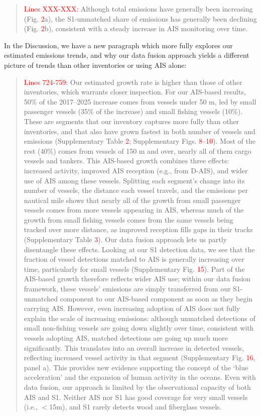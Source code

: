 \documentclass[11pt]{article}
\begin{document}
\begin{quote}
\textcolor{red}{Lines XXX-XXX:}
Although total emissions have generally been increasing (Fig. \textcolor{red}{2}a), the S1-unmatched share of emissions has generally been declining (Fig. \textcolor{red}{2}b), consistent with a steady increase in AIS monitoring over time.
\end{quote}

In the Discussion, we have a new paragraph which more fully explores our estimated emissions trends, and why our data fusion approach yields a different picture of trends than other inventories or using AIS alone:

\begin{quote}
\textcolor{red}{Lines 724-759:}
Our estimated growth rate is higher than those of other inventories, which warrants closer inspection. For our AIS-based results, 50\% of the 2017--2025 increase comes from vessels under 50 m, led by small passenger vessels (35\% of the increase) and small fishing vessels (10\%). These are segments that our inventory captures more fully than other inventories, and that also have grown fastest in both number of vessels and emissions (Supplementary Table \textcolor{red}{2}; Supplementary Figs. \textcolor{red}{8--10}). Most of the rest (40\%) comes from vessels of 150 m and over, nearly all of them cargo vessels and tankers. This AIS-based growth combines three effects: increased activity, improved AIS reception (e.g., from D-AIS), and wider use of AIS among these vessels. Splitting each segment's change into its number of vessels, the distance each vessel travels, and the emissions per nautical mile shows that nearly all of the growth from small passenger vessels comes from more vessels appearing in AIS, whereas much of the growth from small fishing vessels comes from the same vessels being tracked over more distance, as improved reception fills gaps in their tracks (Supplementary Table \textcolor{red}{3}). Our data fusion approach lets us partly disentangle these effects. Looking at our S1 detection data, we see that the fraction of vessel detections matched to AIS is generally increasing over time, particularly for small vessels (Supplementary Fig. \textcolor{red}{15}). Part of the AIS-based growth therefore reflects wider AIS use; within our data fusion framework, these vessels' emissions are simply transferred from our S1-unmatched component to our AIS-based component as soon as they begin carrying AIS. However, even increasing adoption of AIS does not fully explain the scale of increasing emissions: although unmatched detections of small non-fishing vessels are going down slightly over time, consistent with vessels adopting AIS, matched detections are going up much more significantly. This translates into an overall increase in detected vessels, reflecting increased vessel activity in that segment (Supplementary Fig. \textcolor{red}{16}, panel a). This provides new evidence supporting the concept of the `blue acceleration' and the expansion of human activity in the oceans. Even with data fusion, our approach is limited by the observational capacity of both AIS and S1. Neither AIS nor S1 has good coverage for very small vessels (i.e., $<$15m), and S1 rarely detects wood and fiberglass vessels. 
\end{quote}
\end{document}

